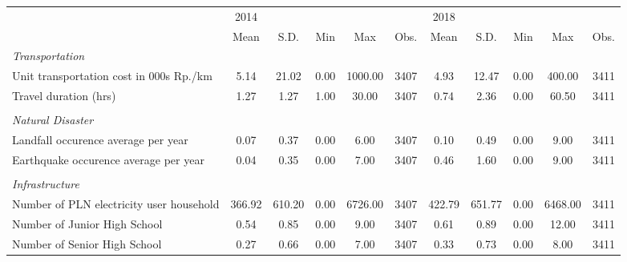 \begin{tabular}{l*{2}{ccccc}}
\toprule
                &     2014&         &         &         &         &     2018&         &         &         &         \\
                &     Mean&     S.D.&      Min&      Max&     Obs.&     Mean&     S.D.&      Min&      Max&     Obs.\\
\midrule
\emph{Transportation}&         &         &         &         &         &         &         &         &         &         \\
\hspace{0.25cm} Unit transportation cost in 000s Rp./km&     5.14&    21.02&     0.00&  1000.00&     3407&     4.93&    12.47&     0.00&   400.00&     3411\\
\hspace{0.25cm} Travel duration (hrs)&     1.27&     1.27&     1.00&    30.00&     3407&     0.74&     2.36&     0.00&    60.50&     3411\\
\\ \emph{Natural Disaster}&         &         &         &         &         &         &         &         &         &         \\
\hspace{0.25cm} Landfall occurence average per year&     0.07&     0.37&     0.00&     6.00&     3407&     0.10&     0.49&     0.00&     9.00&     3411\\
\hspace{0.25cm} Earthquake occurence average per year&     0.04&     0.35&     0.00&     7.00&     3407&     0.46&     1.60&     0.00&     9.00&     3411\\
\\ \emph{Infrastructure}&         &         &         &         &         &         &         &         &         &         \\
\hspace{0.25cm} Number of PLN electricity user household&   366.92&   610.20&     0.00&  6726.00&     3407&   422.79&   651.77&     0.00&  6468.00&     3411\\
\hspace{0.25cm} Number of Junior High School&     0.54&     0.85&     0.00&     9.00&     3407&     0.61&     0.89&     0.00&    12.00&     3411\\
\hspace{0.25cm} Number of Senior High School&     0.27&     0.66&     0.00&     7.00&     3407&     0.33&     0.73&     0.00&     8.00&     3411\\

\end{tabular}

